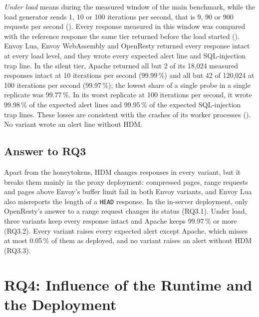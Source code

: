 \documentclass{rptuma}
\begin{document}
\emph{Under load} means during the measured window of the main benchmark, while the load generator
sends 1, 10 or 100 iterations per second, that is 9, 90 or 900 requests per second
(). Every response measured in this window was compared with the
reference response the same tier returned before the load started (). Envoy Lua, Envoy WebAssembly and
OpenResty returned every response intact at every load level, and they wrote every
expected alert line and SQL-injection trap line. In the silent tier, Apache returned all but 2 of
its 18,024 measured responses intact at 10 iterations per second (99.99\,\%) and all but 42 of
120,024 at 100 iterations per second (99.97\,\%); the lowest share of a single probe in a single
replicate was 99.77\,\%. In its worst replicate at 100 iterations per second, it wrote 99.98\,\% of
the expected alert lines and 99.95\,\% of the expected SQL-injection trap lines. These losses are
consistent with the crashes of its worker processes ().
No variant wrote an alert line without HDM.

\subsection{Answer to RQ3}

Apart from the honeytokens, HDM changes responses in every variant, but it breaks them mainly in the
proxy deployment: compressed pages, range requests and pages above Envoy's buffer limit fail in both
Envoy variants, and Envoy Lua also misreports the length of a \texttt{HEAD} response. In the
in-server deployment, only OpenResty's answer to a range request changes its status (RQ3.1). Under
load, three variants keep every response intact and Apache keeps 99.97\,\% or more
(RQ3.2). Every variant raises every expected alert except Apache, which misses at most
0.05\,\% of them as deployed, and no variant raises an alert without HDM (RQ3.3).

\section{RQ4: Influence of the Runtime and the Deployment}
\label{sec:results.rq4}
\end{document}
